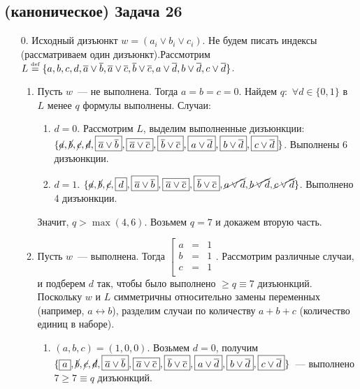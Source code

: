 \documentclass[a4paper]{article}
\def\eqdef{\overset{\mbox{\tiny def}}{=}}
\begin{document}
\subsection*{(каноническое) Задача 26}
\begin{enumerate}
\item [0. ] Исходный дизъюнкт $w=(a_i\vee b_i\vee c_i)$. Не будем писать индексы (рассматриваем один дизъюнкт).\newline Рассмотрим $L\eqdef\{a,b,c,d,\overline{a}\vee\overline{b},\overline{a}\vee\overline{c},\overline{b}\vee\overline{c},a\vee\overline{d},b\vee\overline{d},c\vee\overline{d}\}$.
\begin{enumerate}
\item Пусть $w$~--- не выполнена. Тогда $a=b=c=0$. Найдем $q\colon$ $\forall d\in\{0,1\}$ в $L$ менее $q$ формулы выполнены. Случаи:\begin{enumerate}
\item $d=0$. Рассмотрим $L$, $\boxed{\mbox{выделим}}$ выполненные дизъюнкции: $\{\cancel{a},\cancel{b},\cancel{c},\cancel{d},\boxed{\overline{a}\vee\overline{b}},\boxed{\overline{a}\vee\overline{c}},\boxed{\overline{b}\vee\overline{c}},\boxed{a\vee\overline{d}},\boxed{b\vee\overline{d}},\boxed{c\vee\overline{d}}\}$. Выполнены 6 дизъюнкции.
\item $d=1$. $\{\cancel{a},\cancel{b},\cancel{c},\boxed{d},\boxed{\overline{a}\vee\overline{b}},\boxed{\overline{a}\vee\overline{c}},\boxed{\overline{b}\vee\overline{c}},\cancel{a\vee\overline{d}},\cancel{b\vee\overline{d}},\cancel{c\vee\overline{d}}\}$. Выполнено 4 дизъюнкции.
\end{enumerate}
Значит, $q>\max(4,6)$. Возьмем $q=7$ и докажем вторую часть.
\item Пусть $w$~--- выполнена. Тогда $\left[\begin{array}{ccc}
a & = & 1\\
b & = & 1\\
c & = & 1\\
\end{array}\right.$. Рассмотрим различные случаи, и подберем $d$ так, чтобы было выполнено $\geqslant q\equiv 7$ дизъюнкций. Поскольку $w$ и $L$ симметричны относительно замены переменных (например, $a\leftrightarrow b$), разделим случаи по количеству $a+b+c$ (количество единиц в наборе).\begin{enumerate}
\item $(a,b,c)=(1,0,0)$. Возьмем $d=0$, получим $\{\boxed{a},\cancel{b},\cancel{c},\cancel{d},\boxed{\overline{a}\vee\overline{b}},\boxed{\overline{a}\vee\overline{c}},\boxed{\overline{b}\vee\overline{c}},\boxed{a\vee\overline{d}},\boxed{b\vee\overline{d}},\boxed{c\vee\overline{d}}\}$~--- выполнено $7\geqslant 7\equiv q$ дизъюнкций.

\end{enumerate}
\end{enumerate}
\end{enumerate}
\end{document}

